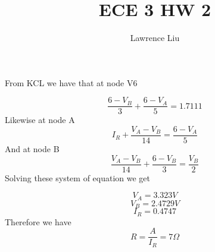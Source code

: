 \documentclass[12pt]{article}
\title{ECE 3 HW 2}
\author{Lawrence Liu}
\begin{document}
\maketitle

From KCL we have that at node V6

$$\frac{6-V_B}{3}+\frac{6-V_A}{5}=1.7111$$
Likewise at node A
$$I_R+\frac{V_A-V_B}{14}=\frac{6-V_A}{5}$$
And at node B
$$\frac{V_A-V_B}{14}+\frac{6-
V_B}{3}=\frac{V_B}{2}$$
Solving these system of equation we get

$$V_A=3.323V$$
$$V_B=2.4729V$$
$$I_R=0.4747$$
Therefore we have
$$R=\frac{A}{I_R}=\boxed{7\Omega}$$
\end{document}
